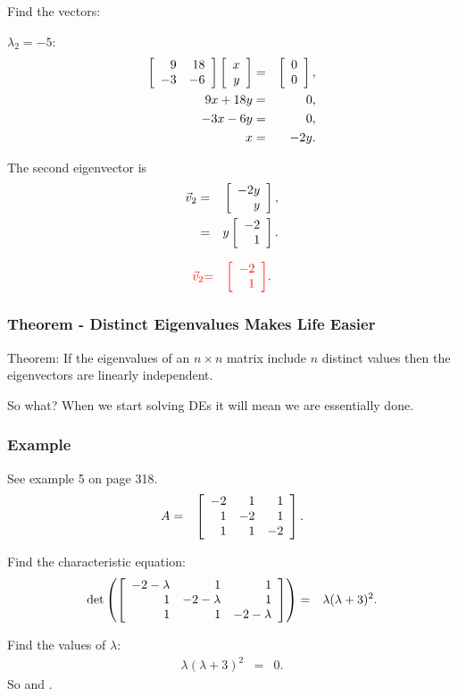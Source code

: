 \begin{frame}
  Find the vectors:

  $\lambda_2 = -5$:
  \begin{eqnarray*}
    \left[ \begin{array}{rr} 9 & 18 \\ -3 & -6 \end{array} \right] \left[ \begin{array}{r} x \\ y \end{array} \right] & = & \left[ \begin{array}{r} 0 \\ 0 \end{array} \right], \\
    9x + 18y & = & 0, \\
    -3x - 6y & = & 0, \\
    x & = & -2 y.
  \end{eqnarray*}

  The second eigenvector is 
  \begin{eqnarray*}
    \vec{v}_2 & = & \left[ \begin{array}{r} -2y \\ y \end{array} \right], \\
    & = & y \left[ \begin{array}{r} -2 \\ 1 \end{array} \right].
  \end{eqnarray*}

  \begin{eqnarray*}
    {\color{red}\vec{v}_2} & {\color{red}=} & {\color{red}\left[ \begin{array}{r} -2 \\ 1 \end{array} \right]}.
  \end{eqnarray*}

\end{frame}



\begin{frame}
  \frametitle{Theorem - Distinct Eigenvalues Makes Life Easier}

  Theorem: If the eigenvalues of an $n\times n$ matrix include $n$
  distinct values then the eigenvectors are linearly independent.

  \vfill

  {
    So what? When we start solving DEs it will mean we are essentially
    done. 
  }

  \vfill

\end{frame}



\begin{frame}
  \frametitle{Example}

  See example 5 on page 318.
  \begin{eqnarray*}
    A & = & \left[ \begin{array}{rrr} -2 & 1 & 1 \\ 1 & -2 & 1 \\ 1 & 1 & -2 \end{array} \right].
  \end{eqnarray*}

  {
    Find the characteristic equation:
    \begin{eqnarray*}
      \det\left(\left[ \begin{array}{rrr} -2-\lambda & 1 & 1 \\ 1 & -2-\lambda & 1 \\ 1 & 1 & -2-\lambda \end{array} \right]\right)
      & = & \lambda (\lambda+3)^2.
    \end{eqnarray*}

    Find the values of $\lambda$:
    \begin{eqnarray*}
      \lambda (\lambda+3)^2 & = & 0.
    \end{eqnarray*}
    So  and .
  }

\end{frame}



